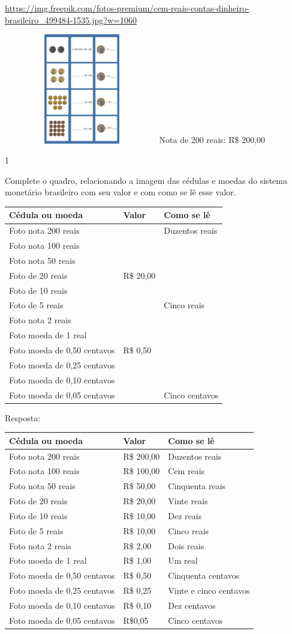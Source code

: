 {\url{https://img.freepik.com/fotos-premium/cem-reais-contas-dinheiro-brasileiro_499484-1535.jpg?w=1060}

\includegraphics[width=2.68333in,height=1.88913in]{media/image71.png}Nota
de 200 reais: R\$ 200,00


\num{1}

Complete o quadro, relacionando a imagem das cédulas e moedas do
sistema monetário brasileiro com seu valor e com como se lê esse valor.


\begin{longtable}[]{@{}lll@{}}
\toprule
Cédula ou moeda & Valor & Como se lê\tabularnewline
\midrule
\endhead
Foto nota 200 reais & & Duzentos reais\tabularnewline
Foto nota 100 reais & &\tabularnewline
Foto nota 50 reais & &\tabularnewline
Foto de 20 reais & R\$ 20,00 &\tabularnewline
Foto de 10 reais & &\tabularnewline
Foto de 5 reais & & Cinco reais\tabularnewline
Foto nota 2 reais & &\tabularnewline
Foto moeda de 1 real & &\tabularnewline
Foto moeda de 0,50 centavos & R\$ 0,50 &\tabularnewline
Foto moeda de 0,25 centavos & &\tabularnewline
Foto moeda de 0,10 centavos & &\tabularnewline
Foto moeda de 0,05 centavos & & Cinco centavos\tabularnewline
\bottomrule
\end{longtable}

Resposta:

\begin{longtable}[]{@{}lll@{}}
\toprule
Cédula ou moeda & Valor & Como se lê\tabularnewline
\midrule
\endhead
Foto nota 200 reais & R\$ 200,00 & Duzentos reais\tabularnewline
Foto nota 100 reais & R\$ 100,00 & Cem reais\tabularnewline
Foto nota 50 reais & R\$ 50,00 & Cinquenta reais\tabularnewline
Foto de 20 reais & R\$ 20,00 & Vinte reais\tabularnewline
Foto de 10 reais & R\$ 10,00 & Dez reais\tabularnewline
Foto de 5 reais & R\$ 10,00 & Cinco reais\tabularnewline
Foto nota 2 reais & R\$ 2,00 & Dois reais\tabularnewline
Foto moeda de 1 real & R\$ 1,00 & Um real\tabularnewline
Foto moeda de 0,50 centavos & R\$ 0,50 & Cinquenta
centavos\tabularnewline
Foto moeda de 0,25 centavos & R\$ 0,25 & Vinte e cinco
centavos\tabularnewline
Foto moeda de 0,10 centavos & R\$ 0,10 & Dez centavos\tabularnewline
Foto moeda de 0,05 centavos & R\$0,05 & Cinco centavos\tabularnewline
\bottomrule
\end{longtable}

}
